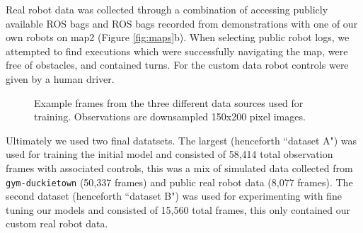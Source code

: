 \documentclass{article}
\begin{document}
Real robot data was collected through a combination of accessing publicly available ROS bags \cite{paull17duckietown} and ROS bags recorded from demonstrations with one of our own robots on map2 (Figure \ref{fig:maps}b). When selecting public robot logs, we attempted to find executions which were successfully navigating the map, were free of obstacles, and contained turns. For the custom data robot controls were given by a human driver.

\begin{figure}
\centering
    \qquad
    \qquad
    \caption{Example frames from the three different data sources used for training. Observations are downsampled 150x200 pixel images.}
    \label{fig:data_examples}
\end{figure}

Ultimately we used two final datatsets. The largest (henceforth ``dataset A") was used for training the initial model and consisted of 58,414 total observation frames with associated controls, this was a mix of simulated data collected from \texttt{gym-duckietown} (50,337 frames) and public real robot data (8,077 frames). The second dataset (henceforth ``dataset B") was used for experimenting with fine tuning our models and consisted of 15,560 total frames, this only contained our custom real robot data.
\end{document}
